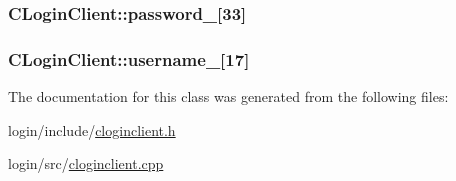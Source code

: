 \subsubsection[{\texorpdfstring{password\+\_\+}{password_}}]{ C\+Login\+Client\+::password\+\_\+\mbox{[}33\mbox{]}\hspace{0.3cm}{\ttfamily [protected]}}\hypertarget{classCLoginClient_ae5e1619291b95ab70a2e0e32a70f9b2e}{}\label{classCLoginClient_ae5e1619291b95ab70a2e0e32a70f9b2e}
\subsubsection[{\texorpdfstring{username\+\_\+}{username_}}]{ C\+Login\+Client\+::username\+\_\+\mbox{[}17\mbox{]}\hspace{0.3cm}{\ttfamily [protected]}}\hypertarget{classCLoginClient_a5588c992cfae4c522ae032e268d63443}{}\label{classCLoginClient_a5588c992cfae4c522ae032e268d63443}


The documentation for this class was generated from the following files\+:\begin{DoxyCompactItemize}
\item 
login/include/\hyperlink{cloginclient_8h}{cloginclient.\+h}\item 
login/src/\hyperlink{cloginclient_8cpp}{cloginclient.\+cpp}\end{DoxyCompactItemize}
